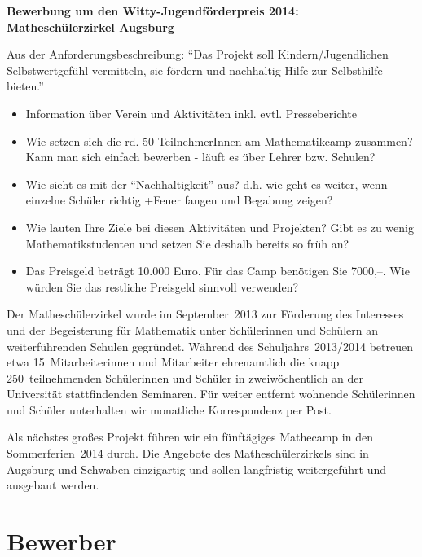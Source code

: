 \documentclass[12pt]{zettel}
\begin{document}
\pagestyle{plain}

\renewcommand{\betreff}{}

\makeletterhead{}

\vspace{-2em}

\begin{center}
  \Large\textbf{\textsf{Bewerbung um den Witty-Jugendförderpreis 2014: \\
  Matheschülerzirkel Augsburg }}
\end{center}

Aus der Anforderungsbeschreibung: "`Das Projekt soll
Kindern/Jugendlichen Selbstwertgefühl vermitteln, sie fördern und nachhaltig
Hilfe zur Selbsthilfe bieten."'

\begin{itemize}
\item Information über Verein und Aktivitäten inkl. evtl. Presseberichte
\item Wie setzen sich die rd. 50 TeilnehmerInnen am Mathematikcamp zusammen? Kann
man sich einfach bewerben - läuft es über Lehrer bzw. Schulen?
\item Wie sieht es mit der "`Nachhaltigkeit"' aus? d.h. wie geht es weiter, wenn
einzelne Schüler richtig +Feuer fangen und Begabung zeigen?
\item Wie lauten Ihre Ziele bei diesen Aktivitäten und Projekten? Gibt es zu
wenig Mathematikstudenten und setzen Sie deshalb bereits so früh an?
\item Das Preisgeld beträgt 10.000 Euro. Für das Camp benötigen Sie 7000,--. Wie
würden Sie das restliche Preisgeld sinnvoll verwenden?
\end{itemize}

Der Matheschülerzirkel wurde im September~2013 zur Förderung des
Interesses und der Begeisterung für Mathematik unter Schülerinnen und Schülern
an weiterführenden Schulen gegründet. Während des Schuljahrs~2013/2014 betreuen
etwa 15~Mitarbeiterinnen und Mitarbeiter ehrenamtlich die knapp
250~teilnehmenden Schülerinnen und Schüler in zweiwöchentlich an der
Universität stattfindenden Seminaren. Für weiter entfernt wohnende Schülerinnen
und Schüler unterhalten wir monatliche Korrespondenz per Post.

Als nächstes großes Projekt führen wir ein fünftägiges Mathecamp in den
Sommerferien~2014 durch. Die Angebote des Matheschülerzirkels sind in Augsburg
und Schwaben einzigartig und sollen langfristig weitergeführt und ausgebaut
werden.


\section{Bewerber}
\end{document}
